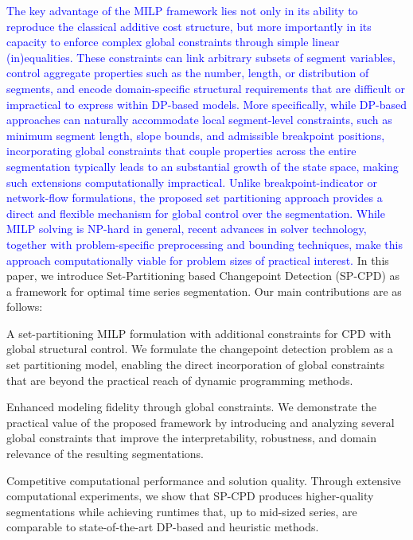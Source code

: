 \documentclass[preprints,article,submit,pdftex,moreauthors]{Definitions/mdpi}
\newcommand{\highlight}[1]{\textcolor{blue}{#1}}
\begin{document}
\highlight{The key advantage of the MILP framework lies not only in its ability to reproduce the classical additive cost structure, but more importantly in its capacity to enforce complex global constraints through simple linear (in)equalities. These constraints can link arbitrary subsets of segment variables, control aggregate properties such as the number, length, or distribution of segments, and encode domain-specific structural requirements that are difficult or impractical to express within DP-based models. More specifically, while DP-based approaches can naturally accommodate local segment-level constraints, such as minimum segment length, slope bounds, and admissible breakpoint positions, incorporating  global constraints that couple properties across the entire segmentation typically leads to an substantial growth of the state space, making such  extensions computationally impractical. Unlike breakpoint-indicator or network-flow formulations, the proposed set partitioning approach provides a direct and flexible mechanism for global control over the segmentation. While MILP solving is NP-hard in general, recent advances in solver technology, together with problem-specific preprocessing and bounding techniques, make this approach computationally viable for problem sizes of practical interest. }
In this paper, we introduce Set-Partitioning based Changepoint Detection (SP-CPD) as a framework for optimal time series segmentation. Our main contributions are as follows:

A set-partitioning MILP formulation with additional constraints for CPD with global structural control.
We formulate the changepoint detection problem as a set partitioning model, enabling the direct incorporation of global constraints that are beyond the practical reach of dynamic programming methods.

Enhanced modeling fidelity through global constraints.
We demonstrate the practical value of the proposed framework by introducing and analyzing several global constraints that improve the interpretability, robustness, and domain relevance of the resulting segmentations.


Competitive computational performance and solution quality.
Through extensive computational experiments, we show that SP-CPD produces higher-quality segmentations while achieving runtimes that, up to mid-sized series, are comparable to state-of-the-art DP-based and heuristic methods.
\end{document}
